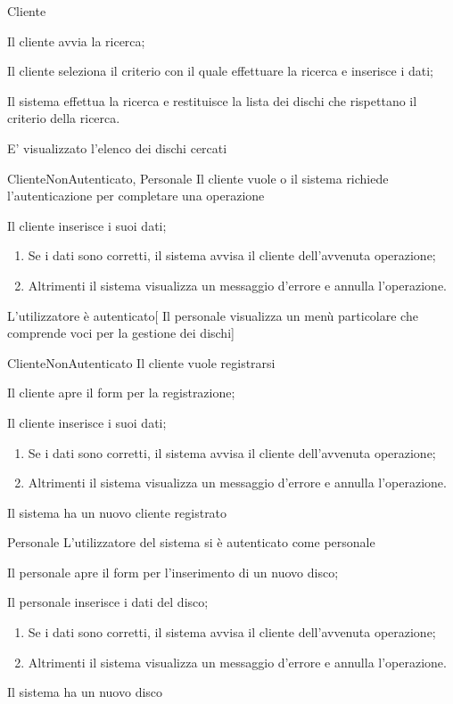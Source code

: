     {Cliente}
    {}
    {   \item Il cliente avvia la ricerca;
        \item Il cliente seleziona il criterio con il quale effettuare la ricerca e inserisce i dati;
        \item Il sistema effettua la ricerca e restituisce la lista dei dischi che rispettano il criterio della ricerca.
    }
    {E' visualizzato l'elenco dei dischi cercati}
    
    {ClienteNonAutenticato, Personale}
    {Il cliente vuole o il sistema richiede l'autenticazione per completare una operazione}
    {   \item Il cliente inserisce i suoi dati;
        \begin{enumerate}[label*=\arabic*.]
            \item Se i dati sono corretti, il sistema avvisa il cliente dell'avvenuta operazione;
            \item Altrimenti il sistema visualizza un \gls{messaggio} d'errore e annulla l'operazione.
        \end{enumerate}
    }
    {L'utilizzatore è autenticato}[
    Il personale visualizza un menù particolare che comprende voci per la gestione dei dischi]

    {ClienteNonAutenticato}
    {Il cliente vuole registrarsi}
    {   \item Il cliente apre il form per la registrazione;
        \item Il cliente inserisce i suoi dati;
        \begin{enumerate}[label*=\arabic*.]
            \item Se i dati sono corretti, il sistema avvisa il cliente dell'avvenuta operazione;
            \item Altrimenti il sistema visualizza un messaggio d'errore e annulla l'operazione.
        \end{enumerate}
    }
    {Il sistema ha un nuovo cliente registrato}

    {Personale}
    {L'utilizzatore del sistema si è autenticato come personale}
    {   \item Il personale apre il form per l'inserimento di un nuovo disco;
        \item Il personale inserisce i dati del disco;
        \begin{enumerate}[label*=\arabic*.]
            \item Se i dati sono corretti, il sistema avvisa il cliente dell'avvenuta operazione;
            \item Altrimenti il sistema visualizza un messaggio d'errore e annulla l'operazione.
        \end{enumerate}        
    }
    {Il sistema ha un nuovo disco}
    
